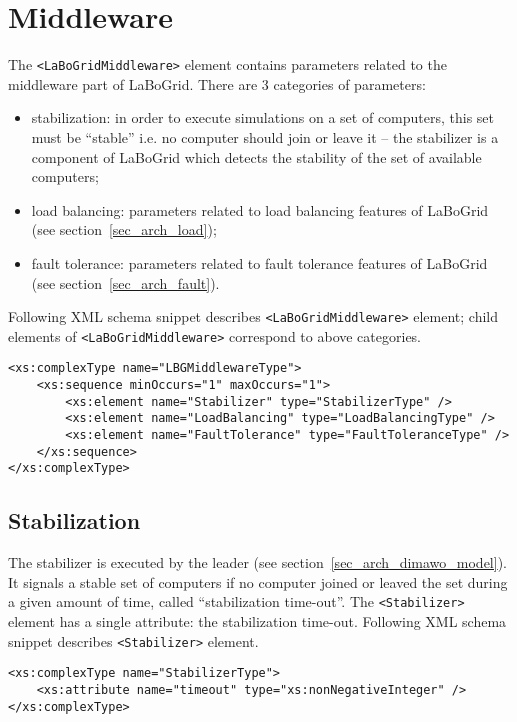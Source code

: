 \section{Middleware}
\label{sec_conf_middle}

The \verb|<LaBoGridMiddleware>| element contains parameters related to the
middleware part of LaBoGrid. There are 3 categories of parameters:

\begin{itemize}
	\item stabilization: in order to execute simulations on a set of computers,
	this set must be ``stable'' i.e. no computer should join or leave it --
	the stabilizer is a component of LaBoGrid which detects the stability of the set
	of available computers;
	\item load balancing: parameters related to load balancing features of LaBoGrid
	(see section~\ref{sec_arch_load});
	\item fault tolerance: parameters related to fault tolerance features of
	LaBoGrid (see section~\ref{sec_arch_fault}).
\end{itemize}

Following XML schema snippet describes \verb|<LaBoGridMiddleware>| element;
child elements of \verb|<LaBoGridMiddleware>| correspond to above categories.

\begin{Verbatim}[tabsize=2,frame=lines]
<xs:complexType name="LBGMiddlewareType">
	<xs:sequence minOccurs="1" maxOccurs="1">
		<xs:element name="Stabilizer" type="StabilizerType" />
		<xs:element name="LoadBalancing" type="LoadBalancingType" />
		<xs:element name="FaultTolerance" type="FaultToleranceType" />
	</xs:sequence>
</xs:complexType>
\end{Verbatim}


\subsection{Stabilization}

The stabilizer is executed by the leader (see
section~\ref{sec_arch_dimawo_model}). It signals a stable set of computers if no
computer joined or leaved the set during a given amount of time, called
``stabilization time-out''. The \verb|<Stabilizer>| element has a single
attribute: the stabilization time-out. Following XML schema snippet describes
\verb|<Stabilizer>| element.

\begin{Verbatim}[tabsize=2,frame=lines]
<xs:complexType name="StabilizerType">
	<xs:attribute name="timeout" type="xs:nonNegativeInteger" />
</xs:complexType>
\end{Verbatim}


